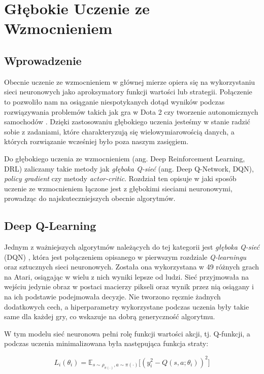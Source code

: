 \documentclass[licencjacka]{pracamgr}
\begin{document}
\chapter{Głębokie Uczenie ze Wzmocnieniem}

\section{Wprowadzenie}

Obecnie uczenie ze wzmocnieniem w głównej mierze opiera się na wykorzystaniu sieci neuronowych jako aproksymatory funkcji wartości lub strategii. Połączenie to pozwoliło nam na osiąganie niespotykanych dotąd wyników podczas rozwiązywania problemów takich jak gra w Dota 2 \cite{dota2} czy tworzenie autonomicznych samochodów \cite{sdc1, sdc2}. Dzięki zastosowaniu głębokiego uczenia jesteśmy w stanie radzić sobie z zadaniami, które charakteryzują się wielowymiarowością danych, a których rozwiązanie wcześniej było poza naszym zasięgiem.

Do głębokiego uczenia ze wzmocnieniem (ang. Deep Reinforcement Learning, DRL) zaliczamy takie metody jak \emph{głęboka Q-sieć} (ang. Deep Q-Network, DQN),  \emph{policy gradient} czy metody \emph{actor-critic}. Rozdział ten opisuje w jaki sposób uczenie ze wzmocnieniem łączone jest z głębokimi sieciami neuronowymi, prowadząc do najskuteczniejszych obecnie algorytmów. 

\section{Deep Q-Learning}

Jednym z ważniejszych algorytmów należących do tej kategorii jest \emph{głęboka Q-sieć} (DQN) \cite{dqn}, która jest połączeniem opisanego w pierwszym rozdziale \emph{Q-learningu} \cite{Q-learning} oraz sztucznych sieci neuronowych. Została ona wykorzystana w 49 różnych grach na Atari, osiągając w wielu z nich wyniki lepsze od ludzi. Sieć przyjmowała na wejściu jedynie obraz w postaci macierzy pikseli oraz wynik przez nią osiągany i na ich podstawie podejmowała decyzje. Nie tworzono ręcznie żadnych dodatkowych cech, a hiperparametry wykorzystane podczas uczenia były takie same dla każdej gry, co wskazuje na dobrą generyczność algorytmu.

W tym modelu sieć neuronowa pełni rolę funkcji wartości akcji, tj. Q-funkcji, a podczas uczenia minimalizowana była następująca funkcja straty:

$$ L_i(\theta_i) = \mathbb{E}_{s \sim \rho_{\pi(\cdot)}, a \sim \pi(\cdot)} \Big[ (y_i^2 - Q(s, a; \theta_i))^2 \Big] $$
\end{document}
